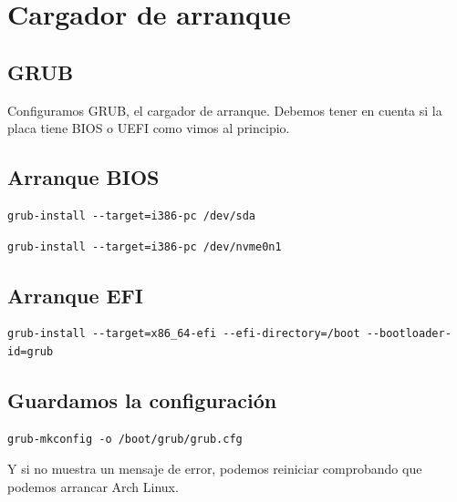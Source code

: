 \section{Cargador de arranque}
\subsection{GRUB}

Configuramos GRUB, el cargador de arranque. Debemos tener en cuenta si la placa tiene BIOS o UEFI como vimos al principio.
    
\subsection{Arranque BIOS}
\begin{tcolorbox}[title=Si se trata de un arranque con disco mecánico o una unidad SSD]
\begin{lstlisting}[style=bashstyle]
grub-install --target=i386-pc /dev/sda
\end{lstlisting}
\end{tcolorbox}

\begin{tcolorbox}[title=Si se trata de un arranque con una unidad M.2]
\begin{lstlisting}[style=bashstyle]
grub-install --target=i386-pc /dev/nvme0n1
\end{lstlisting}
\end{tcolorbox}\vspace{5mm}

\subsection{Arranque EFI}
\begin{tcolorbox}[title=Si se trata de un arranque UEFI]
\begin{lstlisting}[style=bashstyle]
grub-install --target=x86_64-efi --efi-directory=/boot --bootloader-id=grub
\end{lstlisting}
\end{tcolorbox}\vspace{5mm}

\subsection{Guardamos la configuración}
\begin{tcolorbox}[title=Finalmente guardamos la configuración:]
\begin{lstlisting}[style=bashstyle]
grub-mkconfig -o /boot/grub/grub.cfg
\end{lstlisting}
\tcblower
Y si no muestra un mensaje de error, podemos reiniciar comprobando que podemos arrancar Arch Linux.
\end{tcolorbox}
\newpage
